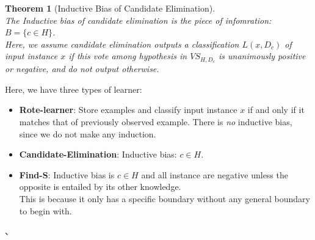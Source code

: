 \documentclass[12pt]{article}
\newtheorem{theorem}{Theorem}[section]
\theoremstyle{definition}
\begin{document}
\begin{theorem}[Inductive Bias of Candidate Elimination]
\hfill\\\normalfont The Inductive bias of candidate elimination is the piece of infomration: $B=\{c\in H\}$.\\
Here, we assume candidate elimination outputs a classification $L(x, D_c)$ of input instance $x$ if this vote among hypothesis in $VS_{H, D_c}$ is unanimously positive or negative, and do not output otherwise.
\end{theorem}
Here, we have three types of learner:
\begin{itemize}
	\item \textbf{Rote-learner}: Store examples and classify input instance $x$ if and only if it matches that of previously observed example. There is \textit{no} inductive bias, since we do not make any induction.
	\item \textbf{Candidate-Elimination}: Inductive bias: $c\in H$.
	\item \textbf{Find-S}: Inductive bias is $c\in H$ and all instance are negative unless the opposite is entailed by its other knowledge.\\
	This is because it only has a specific boundary without any general boundary to begin with.
\end{itemize}、
\clearpage
\end{document}
